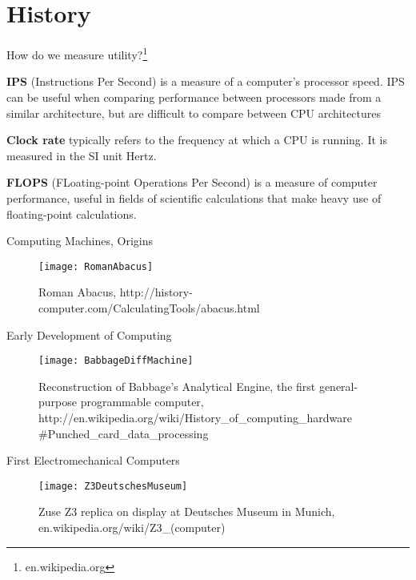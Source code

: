 \documentclass[xcolor=x11names,compress]{beamer}
\renewcommand{\(}{\begin{columns}}
\renewcommand{\)}{\end{columns}}
\newcommand{\<}[1]{\begin{column}{#1}}
\renewcommand{\>}{\end{column}}
\begin{document}
\section{History}
\begin{frame}{How do we measure utility?\footnote{en.wikipedia.org}}

\textbf{IPS} (Instructions Per Second) is a measure of a computer's processor speed. IPS can be useful when comparing performance between processors made from a similar architecture, but are difficult to compare between CPU architectures

\textbf{Clock rate} typically refers to the frequency at which a CPU is running. It is measured in the SI unit Hertz.

\textbf{FLOPS} (FLoating-point Operations Per Second) is a measure of computer performance, useful in fields of scientific calculations that make heavy use of floating-point calculations. 
\end{frame}

\begin{frame}{Computing Machines, Origins}

\begin{figure}
\texttt{[image: RomanAbacus]}
\caption{Roman Abacus, http://history-computer.com/CalculatingTools/abacus.html}
\end{figure}

\end{frame}

\begin{frame}{Early Development of Computing}

\begin{figure}
\texttt{[image: BabbageDiffMachine]}
\caption{Reconstruction of Babbage's Analytical Engine, the first general-purpose programmable computer, http://en.wikipedia.org/wiki/History\_of\_computing\_hardware
\#Punched\_card\_data\_processing}
\end{figure}

\end{frame}

\begin{frame}{First Electromechanical Computers}

\begin{figure}
\texttt{[image: Z3DeutschesMuseum]}
\caption{Zuse Z3 replica on display at Deutsches Museum in Munich, en.wikipedia.org/wiki/Z3\_(computer)}
\end{figure}

\end{frame}
\end{document}
